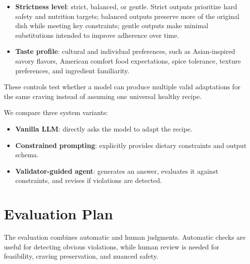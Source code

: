 \documentclass[11pt]{article}
\begin{document}
\begin{itemize}[leftmargin=*]
    \item \textbf{Strictness level}: strict, balanced, or gentle. Strict outputs prioritize hard safety and nutrition targets; balanced outputs preserve more of the original dish while meeting key constraints; gentle outputs make minimal substitutions intended to improve adherence over time.
    \item \textbf{Taste profile}: cultural and individual preferences, such as Asian-inspired savory flavors, American comfort food expectations, spice tolerance, texture preferences, and ingredient familiarity.
\end{itemize}

These controls test whether a model can produce multiple valid adaptations for the same craving instead of assuming one universal healthy recipe.

We compare three system variants:

\begin{itemize}[leftmargin=*]
    \item \textbf{Vanilla LLM}: directly asks the model to adapt the recipe.
    \item \textbf{Constrained prompting}: explicitly provides dietary constraints and output schema.
    \item \textbf{Validator-guided agent}: generates an answer, evaluates it against constraints, and revises if violations are detected.
\end{itemize}

\section{Evaluation Plan}
The evaluation combines automatic and human judgments. Automatic checks are useful for detecting obvious violations, while human review is needed for feasibility, craving preservation, and nuanced safety.
\end{document}
